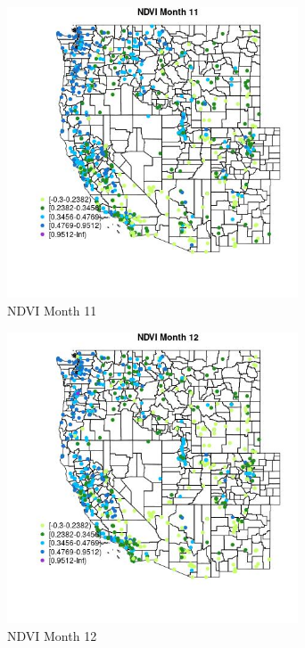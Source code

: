 \begin{figure} 
\centering  
\includegraphics[width=0.77\textwidth]{Code_Outputs/Report_ML_input_PM25_Step4_part_f_de_duplicated_aves_prioritize_24hr_obswNAs_MapObsMo11NDVI.jpg} 
\caption{\label{fig:Report_ML_input_PM25_Step4_part_f_de_duplicated_aves_prioritize_24hr_obswNAsMapObsMo11NDVI}NDVI Month 11} 
\end{figure} 
 

\begin{figure} 
\centering  
\includegraphics[width=0.77\textwidth]{Code_Outputs/Report_ML_input_PM25_Step4_part_f_de_duplicated_aves_prioritize_24hr_obswNAs_MapObsMo12NDVI.jpg} 
\caption{\label{fig:Report_ML_input_PM25_Step4_part_f_de_duplicated_aves_prioritize_24hr_obswNAsMapObsMo12NDVI}NDVI Month 12} 
\end{figure} 
 
